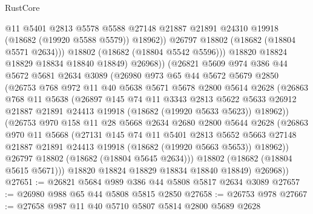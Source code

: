 \begin{lexlean}{RustCore}
\begin{coremodule}
                    @11
                    @5401
                    @2813
                    @5578
                    @5588
                    @27148
                    @21887
                    @21891
                    @24310
                    @19918
                    (@18682 (@19920 @5588 @5579))
                    @18962))
                @26797
                @18802
                (@18682 (@18804 @5571 @2634)))
              @18802
              (@18682 (@18804 @5542 @5596)))
            @18820
            @18824
            @18829
            @18834
            @18840
            @18849)
          @26968))
      (@26821
        @5609
        @974
        @386
        @44
        @5672
        @5681
        @2634
        @3089
        (@26980
          @973
          @65
          @44
          @5672
          @5679
          @2850
          (@26753
            @768
            @972
            @11
            @40
            @5638
            @5671
            @5678
            @2800
            @5614
            @2628
            (@26863
              @768
              @11
              @5638
              (@26897
                @145
                @74
                @11
                @3343
                @2813
                @5622
                @5633
                @26912
                @21887
                @21891
                @24413
                @19918
                (@18682 (@19920 @5633 @5623))
                @18962))
            (@26753
              @970
              @158
              @11
              @28
              @5668
              @2634
              @2680
              @2800
              @5644
              @2628
              (@26863
                @970
                @11
                @5668
                (@27131
                  @145
                  @74
                  @11
                  @5401
                  @2813
                  @5652
                  @5663
                  @27148
                  @21887
                  @21891
                  @24413
                  @19918
                  (@18682 (@19920 @5663 @5653))
                  @18962))
              @26797
              @18802
              (@18682 (@18804 @5645 @2634)))
            @18802
            (@18682 (@18804 @5615 @5671)))
          @18820
          @18824
          @18829
          @18834
          @18840
          @18849)
        @26968))
@27651 := @26821 @5684 @989 @386 @44 @5808 @5817 @2634 @3089
@27657 := @26980 @988 @65 @44 @5808 @5815 @2850
@27658 := @26753 @978
@27667 := @27658 @987 @11 @40 @5710 @5807 @5814 @2800 @5689 @2628

\end{coremodule}
\end{lexlean}
